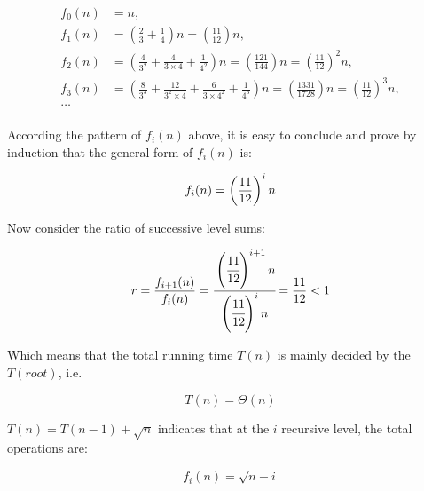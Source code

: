 \begin{homeworkProblem}
\begin{homeworkSubProblem}[$T(n)=2T(n/3)+T(n/4)+n$]
\begin{equation*}
\begin{split}
f_0(n) & = n ,\\
f_1(n) & = \left(\frac{2}{3}+\frac{1}{4}\right) n
         = \left(\frac{11}{12}\right) n ,\\
f_2(n) & = \left(\frac{4}{3^2}+\frac{4}{3\times 4}+\frac{1}{4^2}\right) n
         = \left(\frac{121}{144}\right) n
         = \left(\frac{11}{12}\right)^2 n ,\\
f_3(n) & = \left(\frac{8}{3^3}+\frac{12}{3^2\times 4}+\frac{6}{3\times 4^2}
            +\frac{1}{4^3}\right) n
         = \left(\frac{1331}{1728}\right) n
         = \left(\frac{11}{12}\right)^3 n ,\\
\dotso \\ %
\end{split}
\end{equation*}

According the pattern of $f_i(n)$ above, it is easy to conclude and prove
by induction that the general form of $f_i(n)$ is:

\begin{equation*}
f_i(n) = \left(\frac{11}{12}\right)^i n \\
\end{equation*}

Now consider the ratio of successive level sums:

\begin{equation*}
r = \frac{f_{i+1}(n)}{f_i(n)}
  = \cfrac{\left(\cfrac{11}{12}\right)^{i+1} n}{\left(\cfrac{11}{12}\right)^i n}
  = \frac{11}{12}
  < 1
\end{equation*}

Which means that the total running time $T(n)$ is mainly decided by the $T(root)$, i.e.

\begin{equation} \label{eq:6.3}
T(n) = \Theta(n)
\end{equation}

\end{homeworkSubProblem}

\begin{homeworkSubProblem}[$T(n) = T(n-1) + \sqrt{n}$]

$T(n) = T(n-1) + \sqrt{n}$ indicates that at the $i$ recursive level, the total operations are:

\begin{equation*}
f_i(n) = \sqrt{n-i}
\end{equation*}


\end{homeworkSubProblem}
\end{homeworkProblem}
